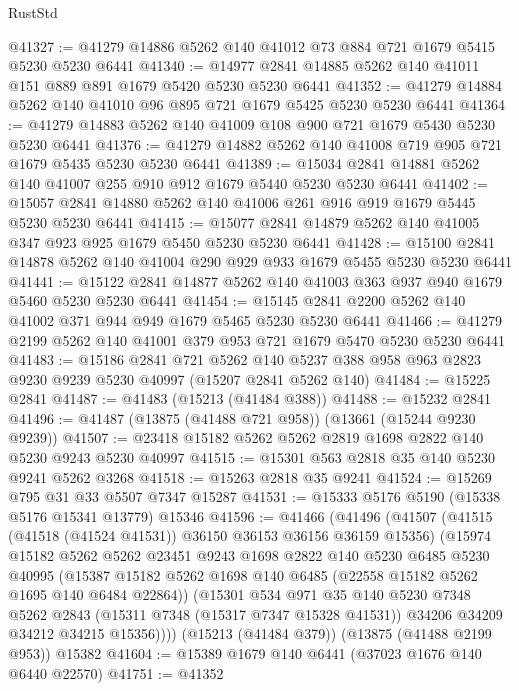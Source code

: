 \begin{lexlean}{RustStd}
\begin{coremodule}
@41327 := @41279 @14886 @5262 @140 @41012 @73 @884 @721 @1679 @5415 @5230 @5230 @6441
@41340 := @14977 @2841 @14885 @5262 @140 @41011 @151 @889 @891 @1679 @5420 @5230 @5230 @6441
@41352 := @41279 @14884 @5262 @140 @41010 @96 @895 @721 @1679 @5425 @5230 @5230 @6441
@41364 := @41279 @14883 @5262 @140 @41009 @108 @900 @721 @1679 @5430 @5230 @5230 @6441
@41376 := @41279 @14882 @5262 @140 @41008 @719 @905 @721 @1679 @5435 @5230 @5230 @6441
@41389 := @15034 @2841 @14881 @5262 @140 @41007 @255 @910 @912 @1679 @5440 @5230 @5230 @6441
@41402 := @15057 @2841 @14880 @5262 @140 @41006 @261 @916 @919 @1679 @5445 @5230 @5230 @6441
@41415 := @15077 @2841 @14879 @5262 @140 @41005 @347 @923 @925 @1679 @5450 @5230 @5230 @6441
@41428 := @15100 @2841 @14878 @5262 @140 @41004 @290 @929 @933 @1679 @5455 @5230 @5230 @6441
@41441 := @15122 @2841 @14877 @5262 @140 @41003 @363 @937 @940 @1679 @5460 @5230 @5230 @6441
@41454 := @15145 @2841 @2200 @5262 @140 @41002 @371 @944 @949 @1679 @5465 @5230 @5230 @6441
@41466 := @41279 @2199 @5262 @140 @41001 @379 @953 @721 @1679 @5470 @5230 @5230 @6441
@41483 := @15186
    @2841
    @721
    @5262
    @140
    @5237
    @388
    @958
    @963
    @2823
    @9230
    @9239
    @5230
    @40997
    (@15207 @2841 @5262 @140)
@41484 := @15225 @2841
@41487 := @41483 (@15213 (@41484 @388))
@41488 := @15232 @2841
@41496 := @41487 (@13875 (@41488 @721 @958)) (@13661 (@15244 @9230 @9239))
@41507 := @23418 @15182 @5262 @5262 @2819 @1698 @2822 @140 @5230 @9243 @5230 @40997
@41515 := @15301 @563 @2818 @35 @140 @5230 @9241 @5262 @3268
@41518 := @15263 @2818 @35 @9241
@41524 := @15269 @795 @31 @33 @5507 @7347 @15287
@41531 := @15333 @5176 @5190 (@15338 @5176 @15341 @13779) @15346
@41596 := @41466
    (@41496
      (@41507
        (@41515 (@41518 (@41524 @41531)) @36150 @36153 @36156 @36159 @15356)
        (@15974
          @15182
          @5262
          @5262
          @23451
          @9243
          @1698
          @2822
          @140
          @5230
          @6485
          @5230
          @40995
          (@15387 @15182 @5262 @1698 @140 @6485 (@22558 @15182 @5262 @1695 @140 @6484 @22864))
          (@15301
            @534
            @971
            @35
            @140
            @5230
            @7348
            @5262
            @2843
            (@15311 @7348 (@15317 @7347 @15328 @41531))
            @34206
            @34209
            @34212
            @34215
            @15356))))
    (@15213 (@41484 @379))
    (@13875 (@41488 @2199 @953))
    @15382
@41604 := @15389 @1679 @140 @6441 (@37023 @1676 @140 @6440 @22570)
@41751 := @41352

\end{coremodule}
\end{lexlean}
